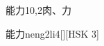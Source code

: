 \begin{entry}{能力}{10,2}{⾁、⼒}
  \begin{phonetics}{能力}{neng2li4}[][HSK 3]
  \end{phonetics}
\end{entry}
